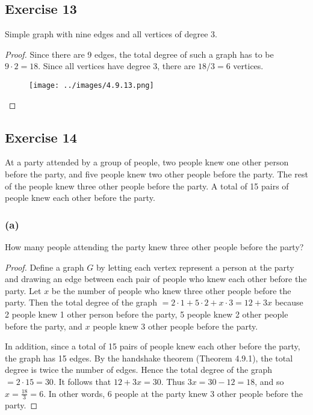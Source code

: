 \documentclass[14pt]{extarticle}
\begin{document}
\subsection{Exercise 13}
Simple graph with nine edges and all vertices of degree 3.

\begin{proof}
    Since there are 9 edges, the total degree of such a graph has to be $9 \cdot 2 = 18$. Since all vertices have degree 3, there are $18 / 3 = 6$ vertices.
    \begin{figure}[ht!]
        \centering
        \texttt{[image: ../images/4.9.13.png]}
    \end{figure}
\end{proof}

\subsection{Exercise 14}
At a party attended by a group of people, two people knew one other person before the party, and five people knew two other people before the party. The rest of the people knew three other people before the party. A total of 15 pairs of people knew each other before the party.

\subsubsection{(a)}
How many people attending the party knew three other people before the party?

\begin{proof}
    Define a graph $G$ by letting each vertex represent a person at the party and drawing an edge between each pair of people who knew each other before the party. Let $x$ be the number of people who knew three other people before the party. Then the total degree of the graph $ = 2\cdot 1 + 5\cdot 2 + x\cdot 3 = 12 + 3x$ because 2 people knew 1 other person before the party, 5 people knew 2 other people before the party, and $x$ people knew 3 other people before the party.

    In addition, since a total of 15 pairs of people knew each other before the party, the graph has 15 edges. By the handshake theorem (Theorem 4.9.1), the total degree is twice the number of edges. Hence the total degree of the graph $= 2 \cdot 15 = 30$. It follows that $12 + 3x = 30$. Thus $3x = 30 - 12 = 18$, and so $x = \frac{18}{3} = 6$. In other words, 6 people at the party knew 3 other people before the party.
\end{proof}
\end{document}
